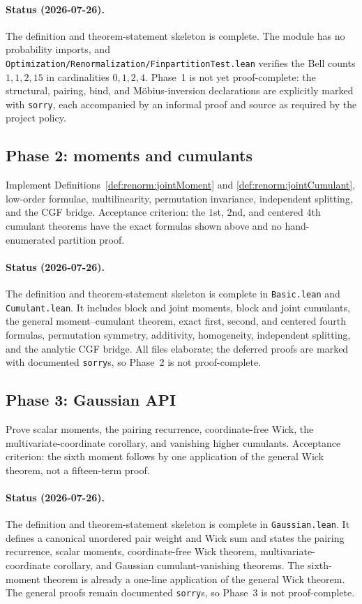 \paragraph{Status (2026-07-26).}
The definition and theorem-statement skeleton is complete.  The module has no probability imports,
and \texttt{Optimization/Renormalization/FinpartitionTest.lean} verifies the Bell counts
$1,1,2,15$ in
cardinalities $0,1,2,4$.  Phase~1 is not yet proof-complete: the structural, pairing, bind, and
M\"obius-inversion declarations are explicitly marked with \texttt{sorry}, each accompanied by an
informal proof and source as required by the project policy.

\subsection*{Phase 2: moments and cumulants}
Implement Definitions~\ref{def:renorm:jointMoment} and \ref{def:renorm:jointCumulant}, low-order
formulae, multilinearity, permutation invariance, independent splitting, and the CGF bridge.
Acceptance criterion: the $1$st, $2$nd, and centered $4$th cumulant theorems have the exact formulas
shown above and no hand-enumerated partition proof.

\paragraph{Status (2026-07-26).}
The definition and theorem-statement skeleton is complete in \texttt{Basic.lean} and
\texttt{Cumulant.lean}.  It includes block and joint moments, block and joint cumulants, the general
moment--cumulant theorem, exact first, second, and centered fourth formulas, permutation symmetry,
additivity, homogeneity, independent splitting, and the analytic CGF bridge.  All files elaborate;
the deferred proofs are marked with documented \texttt{sorry}s, so Phase~2 is not proof-complete.

\subsection*{Phase 3: Gaussian API}
Prove scalar moments, the pairing recurrence, coordinate-free Wick, the multivariate-coordinate
corollary, and vanishing higher cumulants.  Acceptance criterion: the sixth moment follows by one
application of the general Wick theorem, not a fifteen-term proof.

\paragraph{Status (2026-07-26).}
The definition and theorem-statement skeleton is complete in \texttt{Gaussian.lean}.  It defines a
canonical unordered pair weight and Wick sum and states the pairing recurrence, scalar moments,
coordinate-free Wick theorem, multivariate-coordinate corollary, and Gaussian cumulant-vanishing
theorems.  The sixth-moment theorem is already a one-line application of the general Wick theorem.
The general proofs remain documented \texttt{sorry}s, so Phase~3 is not proof-complete.

